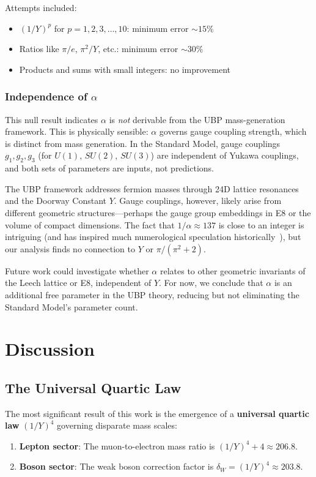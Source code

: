 \documentclass[11pt,a4paper]{article}
\begin{document}
Attempts included:
\begin{itemize}
\item $(1/Y)^p$ for $p = 1, 2, 3, \ldots, 10$: minimum error $\sim 15\%$
\item Ratios like $\pi/e$, $\pi^2/Y$, etc.: minimum error $\sim 30\%$
\item Products and sums with small integers: no improvement
\end{itemize}

\subsubsection{Independence of $\alpha$}

This null result indicates $\alpha$ is \emph{not} derivable from the UBP mass-generation framework. This is physically sensible: $\alpha$ governs gauge coupling strength, which is distinct from mass generation. In the Standard Model, gauge couplings $g_1, g_2, g_3$ (for $U(1)$, $SU(2)$, $SU(3)$) are independent of Yukawa couplings, and both sets of parameters are inputs, not predictions.

The UBP framework addresses fermion masses through 24D lattice resonances and the Doorway Constant $Y$. Gauge couplings, however, likely arise from different geometric structures—perhaps the gauge group embeddings in E8 or the volume of compact dimensions. The fact that $1/\alpha \approx 137$ is close to an integer is intriguing (and has inspired much numerological speculation historically~\cite{ref003}), but our analysis finds no connection to $Y$ or $\pi/(\pi^2+2)$.

Future work could investigate whether $\alpha$ relates to other geometric invariants of the Leech lattice or E8, independent of $Y$. For now, we conclude that $\alpha$ is an additional free parameter in the UBP theory, reducing but not eliminating the Standard Model's parameter count.

\section{Discussion}

\subsection{The Universal Quartic Law}

The most significant result of this work is the emergence of a \textbf{universal quartic law} $(1/Y)^4$ governing disparate mass scales:
\begin{enumerate}
\item \textbf{Lepton sector}: The muon-to-electron mass ratio is $(1/Y)^4 + 4 \approx 206.8$.
\item \textbf{Boson sector}: The weak boson correction factor is $\delta_W = (1/Y)^4 \approx 203.8$.
\end{enumerate}
\end{document}
